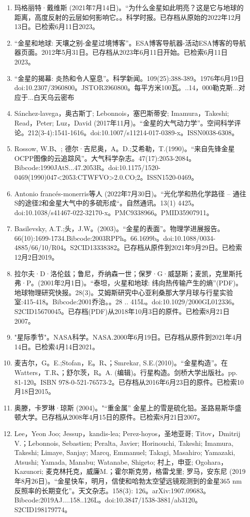 \begin{enumerate}
\item 玛格丽特·戴维斯 (2021年7月14日)。“为什么金星如此明亮？这是它与地球的距离，高度反射的云层如何影响它。。科学时报。已存档从原始的2022年12月13日。已检索6月11日2023。
\item “金星和地球: 天壤之别-金星过境博客”。ESA博客导航器-活动ESA博客的导航器页面。2012年5月31日。已存档从2023年6月11日开始。已检索6月11日2023。
\item “金星的揭幕: 炎热和令人窒息”。科学新闻。109(25):388-389。1976年6月19日doi:10.2307/3960800。JSTOR3960800。每平方米100瓦。..14，000勒克斯...对应于...白天乌云密布 
\item Sánchez-lavega，奥古斯丁; Lebonnois，塞巴斯蒂安; Imamura，Takeshi; Read，Peter; Luz，David (2017年11月)。“金星的大气动力学”。空间科学评论。212(3-4):1541-1616。doi:10.1007/s11214-017-0389-x。ISSN0038-6308。 
\item Rossow, W.B、; 德尔·吉尼奥，A。D.;艾希勒，T.(1990)。“来自先锋金星OCPP图像的云追踪风”。大气科学杂志。47(17):2053-2084。Bibcode:1990JAtS...47.2053R。doi:10.1175/1520-0469(1990)047<2053:CTWFVO>2.0.CO;2。ISSN1520-0469。 
\item Antonio francés-monerris等人 (2022年7月30日)。“光化学和热化学路径 -- 通往S的途径2和金星大气中的多硫形成“。自然通讯。13(1) 4425。doi:10.1038/s41467-022-32170-x。PMC9338966。PMID35907911。  
\item Basilevsky, A.T.;头，J.W。(2003)。“金星的表面”。物理学进展报告。66(10):1699-1734.Bibcode:2003RPPh。66.1699b。doi:10.1088/0034-4885/66/10/R04。S2CID13338382。已存档从原件到2021年9月29日。已检索12月2日2019。 
\item 拉尔夫·D·洛伦兹；鲁尼，乔纳森一世；保罗·G·威瑟斯；麦凯，克里斯托弗·P。(2001年2月1日)。“泰坦，火星和地球: 纬向热传输产生的熵”(PDF)。地球物理研究快报。28(3)。艾姆斯研究中心亚利桑那大学月球与行星实验室:415-418。Bibcode:2001乔治。。28 .. 415L。doi:10.1029/2000GL012336。S2CID15670045。已存档(PDF)从2018年10月3日的原件。已检索8月21日2007。  
\item "星际季节"。NASA科学。NASA.2000年6月19日。已存档从原件到2021年4月14日。已检索4月14日2021。
\item 麦吉尔，G。E.;Stofan，E。R、；Smrekar, S.E.(2010)。“金星构造”。在Watters，T.R、；舒尔茨，R。A. (编辑)。行星构造。剑桥大学出版社。pp. 81-120。ISBN 978-0-521-76573-2。已存档从2016年6月23日的原件。已检索10月18日2015。
\item 奥滕，卡罗琳·琼斯 (2004)。"“重金属” 金星上的雪是硫化铅。圣路易斯华盛顿大学。已存档从2008年4月15日的原件。已检索8月21日2007。
\item Lee，Yeon Joo; Jessup，kandis-lea; Perez-hoyos，圣地亚哥; Titov，Dmitrij V.；Lebonnois, Sebastien; Peralta, Javier; Horinouchi, Takeshi; Imamura, Takeshi; Limaye, Sanjay; Marcq, Emmanuel; Takagi, Masahiro; Yamazaki, Atsushi; Yamada, Manabu; Watanabe, Shigeto; 村上，申亚; Ogohara，Kazunori; 麦克林托克，威廉M.；霍尔斯克劳，格雷戈里; 罗马，安东尼 (2019年8月26日)。“金星快车，明月，信使和哈勃太空望远镜观测到的金星365 nm反照率的长期变化”。天文杂志。158(3): 126。arXiv:1907.09683。Bibcode:2019AJ....158..126L。doi:10.3847/1538-3881/ab3120。S2CID198179774。

\end{enumerate}
